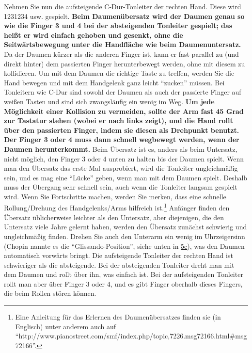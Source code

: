 Nehmen Sie nun die aufsteigende C-Dur-Tonleiter der rechten Hand.
Diese wird 1231234 usw. gespielt.
\textbf{Beim Daumenübersatz wird der Daumen genau so wie die Finger 3 und 4 bei der absteigenden Tonleiter gespielt; das heißt er wird einfach gehoben und gesenkt, ohne die Seitwärtsbewegung unter die Handfläche wie beim Daumenuntersatz.}
Da der Daumen kürzer als die anderen Finger ist, kann er fast parallel zu (und direkt hinter) dem passierten Finger herunterbewegt werden, ohne mit diesem zu kollidieren.
Um mit dem Daumen die richtige Taste zu treffen, werden Sie die Hand bewegen und mit dem Handgelenk ganz leicht \enquote{zucken} müssen.
Bei Tonleitern wie C-Dur sind sowohl der Daumen als auch der passierte Finger auf weißen Tasten und sind sich zwangsläufig ein wenig im Weg.
\textbf{Um jede Möglichkeit einer Kollision zu vermeiden, sollte der Arm fast 45 Grad zur Tastatur stehen (wobei er nach links zeigt), und die Hand rollt über den passierten Finger, indem sie diesen als Drehpunkt benutzt.
Der Finger 3 oder 4 muss dann schnell wegbewegt werden, wenn der Daumen herunterkommt.}
Beim Übersatz ist es, anders als beim Untersatz, nicht möglich, den Finger 3 oder 4 unten zu halten bis der Daumen spielt.
Wenn man den Übersatz das erste Mal ausprobiert, wird die Tonleiter ungleichmäßig sein, und es mag eine \enquote{Lücke} geben, wenn man mit dem Daumen spielt.
Deshalb muss der Übergang sehr schnell sein, auch wenn die Tonleiter langsam gespielt wird.
Wenn Sie Fortschritte machen, werden Sie merken, dass eine schnelle Rollung/Drehung des Handgelenks/Arms hilfreich ist.\footnote{Eine Anleitung für das Erlernen des Daumenübersatzes finden sie (in Englisch) unter anderem auch auf \enquote{http://www.pianostreet.com/smf/index.php/topic,7226.msg72166.html\#msg72166}.}
Anfänger finden den Übersatz üblicherweise leichter als den Untersatz, aber diejenigen, die den Untersatz viele Jahre gelernt haben, werden den Übersatz zunächst schwierig und ungleichmäßig finden.
Drehen Sie auch den Unterarm ein wenig im Uhrzeigersinn (Chopin nannte es die \enquote{Glissando-Position}, siehe unten in \hyperref[c1iii5c]{5c}), was den Daumen automatisch vorwärts bringt.
Die aufsteigende Tonleiter der rechten Hand ist schwieriger als die absteigende.
Bei der absteigenden Tonleiter dreht man mit dem Daumen und rollt über ihn, was einfach ist.
Bei der aufsteigenden Tonleiter rollt man aber über Finger 3 oder 4, und es gibt Finger oberhalb dieses Fingers, die beim Rollen stören können.

